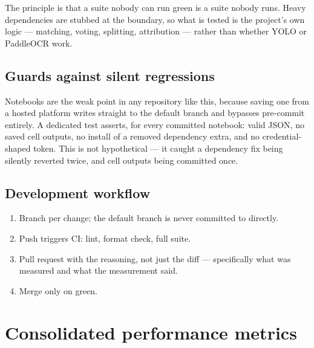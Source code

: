 \documentclass[11pt,a4paper]{article}
\begin{document}
The principle is that a suite nobody can run green is a suite nobody runs. Heavy
dependencies are stubbed at the boundary, so what is tested is the project's own
logic --- matching, voting, splitting, attribution --- rather than whether YOLO
or PaddleOCR work.

\subsection{Guards against silent regressions}

Notebooks are the weak point in any repository like this, because saving one from
a hosted platform writes straight to the default branch and bypasses pre-commit
entirely. A dedicated test asserts, for every committed notebook: valid JSON, no
saved cell outputs, no install of a removed dependency extra, and no
credential-shaped token. This is not hypothetical --- it caught a dependency fix
being silently reverted twice, and cell outputs being committed once.

\subsection{Development workflow}

\begin{enumerate}[leftmargin=*]
  \item Branch per change; the default branch is never committed to directly.
  \item Push triggers CI: lint, format check, full suite.
  \item Pull request with the reasoning, not just the diff --- specifically what
        was measured and what the measurement said.
  \item Merge only on green.
\end{enumerate}

\newpage
\section{Consolidated performance metrics}
\label{sec:metrics}
\end{document}
